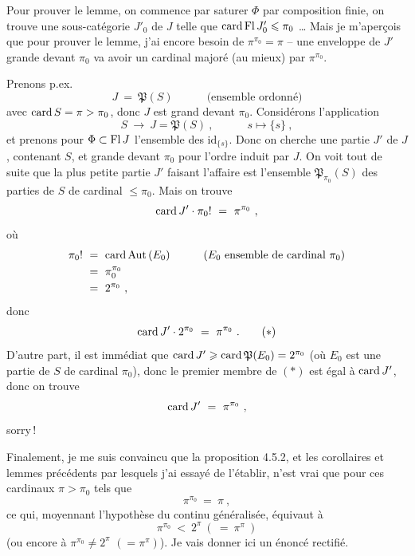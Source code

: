 
Pour prouver le lemme, on commence par saturer $\Phi$ par composition finie, on trouve une sous-catégorie $J'_0$ de $J$ telle que $\operatorname{card}\operatorname{Fl} J'_0 \leqslant \pi_0$ \ldots{} Mais je m'aperçois que pour prouver le lemme, j'ai encore besoin de $\pi^{\pi_0} = \pi$ -- une enveloppe de $J'$ grande devant $\pi_0$ va avoir un cardinal majoré (au mieux) par $\pi^{\pi_0}$.

Prenons p.ex.
\[
J \ =\ \mathfrak{P}(S) \qquad\quad \text{(ensemble ordonné)}
\]
avec $\operatorname{card} S = \pi > \pi_0$, donc $J$ est grand devant $\pi_0$. Considérons l'application
\[
S \ \longrightarrow\ J = \mathfrak{P}(S)\ , \qquad\quad s \longmapsto \{s\}\ ,
\]
et prenons pour $\Phi \subset \operatorname{Fl} J$ l'ensemble des $\mathrm{id}_{\{s\}}$. Donc on cherche une partie $J'$ de $J$, contenant $S$, et grande devant $\pi_0$ pour l'ordre induit par $J$. On voit tout de suite que la plus petite partie $J'$ faisant l'affaire est l'ensemble $\mathfrak{P}_{\pi_0}(S)$ des parties de $S$ de cardinal $\leqslant \pi_0$. Mais on trouve
\[
\card J' \cdot \pi_0! \ =\ \pi^{\pi_0}\ ,
\]
où
\[
\begin{aligned}
\pi_0! \ &=\ \operatorname{card}\operatorname{Aut}\,(E_0) \qquad\quad (E_0 \text{ ensemble de cardinal } \pi_0)\\
&=\ \pi_0^{\pi_0}\\
&=\ 2^{\pi_0}\ ,
\end{aligned}
\]
donc
\[
\operatorname{card} J' \cdot 2^{\pi_0} \ =\ \pi^{\pi_0}\ .
\tag*{$(*)$}
\]
D'autre part, il est immédiat que $\operatorname{card} J' \geqslant \operatorname{card}\mathfrak{P}(E_0) = 2^{\pi_0}$ (où $E_0$ est une partie de $S$ de cardinal $\pi_0$), donc le premier membre de $(*)$ est égal à $\operatorname{card} J'$, donc on trouve
\[
\operatorname{card} J' \ =\ \pi^{\pi_0}\ ,
\]
sorry\,!

Finalement, je me suis convaincu que la proposition 4.5.2, et les corollaires et lemmes précédents par lesquels j'ai essayé de l'établir, n'est vrai que pour ces cardinaux $\pi > \pi_0$ tels que
\[
\pi^{\pi_0} \ =\ \pi\ ,
\]
ce qui, moyennant l'hypothèse du continu généralisée, équivaut à
\[
\pi^{\pi_0} \ <\ 2^{\pi}\ (\ =\ \pi^{\pi}\ )
\]
(ou encore à $\pi^{\pi_0} \neq 2^{\pi}$ $(= \pi^{\pi})$). Je vais donner
ici un énoncé rectifié.


